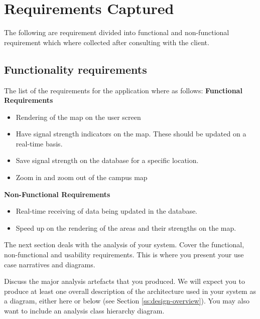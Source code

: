 \section{Requirements Captured}
The following are requirement divided into functional and non-functional requirement which where collected after consulting with the client.
\subsection*{Functionality requirements}
The list of the requirements for the application where as follows:
\newline\textbf{Functional Requirements}
\begin{itemize}
	\item Rendering of the map on the user screen
	\item Have signal strength indicators on the map. These should be updated on a real-time basis.
	\item Save signal strength on the database for a specific location.
	\item Zoom in and zoom out of the campus map
\end{itemize}
\textbf{Non-Functional Requirements}
\begin{itemize}
	\item Real-time receiving of data being updated in the database.
	\item Speed up on the rendering of the areas and their strengths on the map.
\end{itemize}



The next section deals with the analysis of your system. Cover the
functional, non-functional and usability requirements. This is where
you present your use case narratives and diagrams. 

Discuss the major analysis artefacts that you produced. We will expect
you to produce at least one overall description of the architecture
used in your system as a diagram, either here or below (see Section
\ref{ss:design-overview}). You may also want to include an analysis
class hierarchy diagram.

